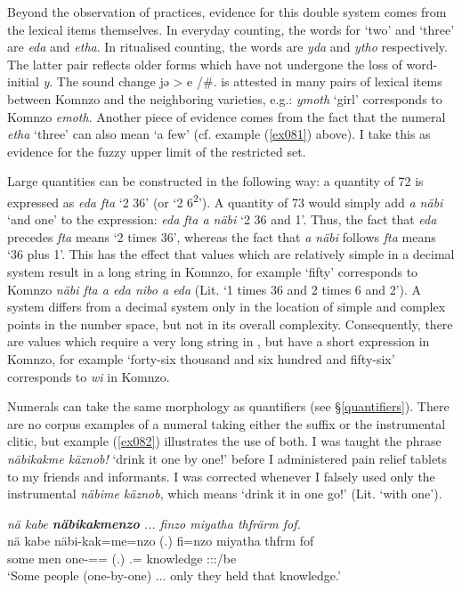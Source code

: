 Beyond the observation of practices, evidence for this double system comes from the lexical items themselves. In everyday counting, the words for `two' and `three' are \emph{eda} and \emph{etha}. In ritualised counting, the words are \emph{yda} and \emph{ytho} respectively. The latter pair reflects older forms which have not undergone the loss of word-initial \emph{y}. The sound change jə > e /\#. is attested in many pairs of lexical items between Komnzo and the neighboring  varieties, e.g.:  \emph{ymoth} `girl' corresponds to Komnzo \emph{emoth}. Another piece of evidence comes from the fact that the numeral \emph{etha} `three' can also mean `a few' (cf. example (\ref{ex081}) above). I take this as evidence for the fuzzy upper limit of the restricted set.%

Large quantities can be constructed in the following way: a quantity of 72 is expressed as \emph{eda fta} `2 36' (or `2 6\textsuperscript{2}'). A quantity of 73 would simply add \emph{a näbi} `and one' to the expression: \emph{eda fta a näbi} `2 36 and 1'. Thus, the fact that \emph{eda} precedes \emph{fta} means `2 times 36', whereas the fact that \emph{a näbi} follows \emph{fta} means `36 plus 1'. This has the effect that values which are relatively simple in a decimal system result in a long string in Komnzo, for example  `fifty' corresponds to Komnzo \emph{näbi fta a eda nibo a eda} (Lit. `1 times 36 and 2 times 6 and 2'). A  system differs from a decimal system only in the location of simple and complex points in the number space, but not in its overall complexity. Consequently, there are values which require a very long string in , but have a short expression in Komnzo, for example `forty-six thousand and six hundred and fifty-six' corresponds to \emph{wi} in Komnzo.%

Numerals can take the same morphology as quantifiers (see \S{}\ref{quantifiers}). There are no corpus examples of a numeral taking either the  suffix or the instrumental  clitic, but example (\ref{ex082}) illustrates the use of both. I was taught the phrase \emph{näbikakme käznob!} `drink it one by one!' before I administered pain relief tablets to my friends and informants. I was corrected whenever I falsely used only the instrumental \emph{näbime käznob}, which means `drink it in one go!' (Lit. `with one').

\begin{exe}
	\ex \emph{nä kabe \textbf{näbikakmenzo} ... finzo miyatha thfrärm fof.}\\
	\gll nä kabe näbi-kak=me=nzo (.) fi=nzo miyatha thfrm fof\\
	some men one-\Distr{}=\Ins{}=\Only{} (.) \Third.\Abs{}=\Only{} knowledge \Stpl{}:\Sbj:\Pst{}:\Dur{}/be \Emph{}\\
	\trans `Some people (one-by-one) ... only they held that knowledge.'\\
	\label{ex082}
\end{exe}

